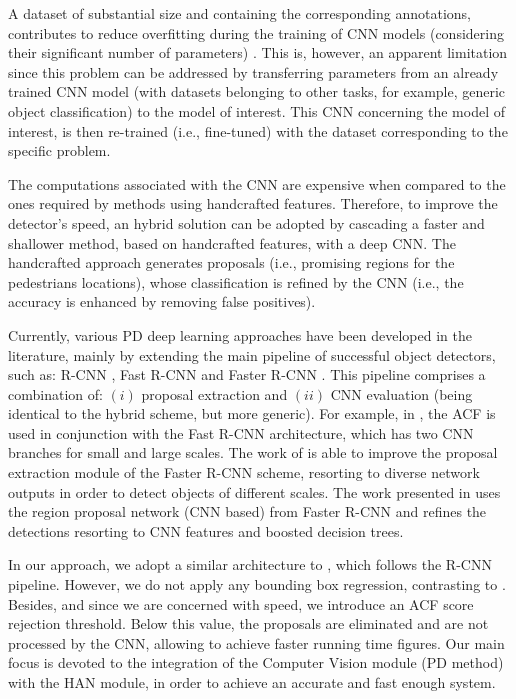 \documentclass[5p,time]{elsarticle}
\begin{document}
A dataset of substantial size and containing the corresponding annotations, contributes to reduce overfitting during the training of CNN models (considering their significant number of parameters) \cite{KrizhevskyNIPS2012}.
This is, however, an apparent limitation since this problem can be addressed by transferring parameters from an already trained CNN model (with datasets belonging to other tasks, for example, generic object classification) to the  model of interest. This CNN concerning the model of interest, is then re-trained (i.e., fine-tuned) with the dataset corresponding to the specific problem.

The computations associated with the CNN are expensive when compared to the ones required by methods using handcrafted features. Therefore, to improve the detector's speed, an hybrid solution can be adopted by cascading a faster and shallower method, based on handcrafted features, with a deep CNN. The handcrafted approach generates proposals (i.e., promising regions for the pedestrians locations), whose classification is refined by the CNN (i.e., the accuracy is enhanced by removing false positives).

Currently, various PD deep learning approaches have been developed in the literature, mainly by extending the main pipeline of successful object detectors, such as: R-CNN \cite{Girshick2014}, Fast R-CNN \cite{girshick15fastrcnn} and Faster R-CNN \cite{ren2015faster}. This pipeline comprises a combination of: $(i)$ proposal extraction and $(ii)$ CNN evaluation (being identical to the hybrid scheme, but more generic). For example, in \cite{Li2015}, the ACF is used in conjunction with the Fast R-CNN architecture, which has two CNN branches for small and large scales. The work of \cite{Cai2016} is able to improve the proposal extraction module of the Faster R-CNN scheme, resorting to diverse network outputs in order to detect objects of different scales. The work presented in \cite{Zhang2016} uses the region proposal network (CNN based) from Faster R-CNN and refines the detections resorting to CNN features and boosted decision trees.

In our approach, we adopt a similar architecture to \cite{HosangCVPR2015,RibeiroPR2016}, which follows the R-CNN pipeline. However, we do not apply any bounding box regression, contrasting to \cite{HosangCVPR2015}. Besides, and since we are concerned with speed, we introduce an ACF score rejection threshold. Below this value, the proposals are eliminated and are not processed by the CNN, allowing to achieve faster running time figures. Our main focus is devoted to the integration of the Computer Vision module (PD method) with the HAN module, in order to achieve an accurate and fast enough system.
\end{document}
